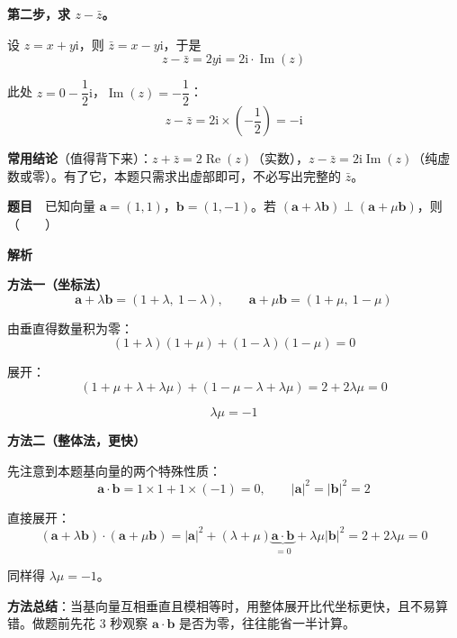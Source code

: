 \textbf{第二步，求 $z-\bar z$。}

设 $z=x+y\mathrm i$，则 $\bar z=x-y\mathrm i$，于是
\[z-\bar z=2y\mathrm i=2\mathrm i\cdot\operatorname{Im}(z)\]

此处 $z=0-\dfrac12\mathrm i$，$\operatorname{Im}(z)=-\dfrac12$：
\[z-\bar z=2\mathrm i\times\left(-\frac12\right)=-\mathrm i\]


\begin{gktip}
\textbf{常用结论}（值得背下来）：$z+\bar z=2\operatorname{Re}(z)$（实数），$z-\bar z=2\mathrm i\operatorname{Im}(z)$（纯虚数或零）。有了它，本题只需求出虚部即可，不必写出完整的 $\bar z$。
\end{gktip}

\par\medskip


\textbf{题目}　已知向量 $\boldsymbol a=(1,1)$，$\boldsymbol b=(1,-1)$。若 $(\boldsymbol a+\lambda\boldsymbol b)\perp(\boldsymbol a+\mu\boldsymbol b)$，则（　　）

\textbf{解析}

\textbf{方法一（坐标法）}
\[\boldsymbol a+\lambda\boldsymbol b=(1+\lambda,\ 1-\lambda),\qquad \boldsymbol a+\mu\boldsymbol b=(1+\mu,\ 1-\mu)\]

由垂直得数量积为零：
\[(1+\lambda)(1+\mu)+(1-\lambda)(1-\mu)=0\]

展开：
\[\left(1+\mu+\lambda+\lambda\mu\right)+\left(1-\mu-\lambda+\lambda\mu\right)=2+2\lambda\mu=0\]

\[\lambda\mu=-1\]

\textbf{方法二（整体法，更快）}

先注意到本题基向量的两个特殊性质：
\[\boldsymbol a\cdot\boldsymbol b=1\times1+1\times(-1)=0,\qquad |\boldsymbol a|^{2}=|\boldsymbol b|^{2}=2\]

直接展开：
\[(\boldsymbol a+\lambda\boldsymbol b)\cdot(\boldsymbol a+\mu\boldsymbol b)=|\boldsymbol a|^{2}+(\lambda+\mu)\underbrace{\boldsymbol a\cdot\boldsymbol b}_{=0}+\lambda\mu|\boldsymbol b|^{2}=2+2\lambda\mu=0\]

同样得 $\lambda\mu=-1$。


\begin{gktip}
\textbf{方法总结}：当基向量互相垂直且模相等时，用整体展开比代坐标更快，且不易算错。做题前先花 3 秒观察 $\boldsymbol a\cdot\boldsymbol b$ 是否为零，往往能省一半计算。
\end{gktip}

